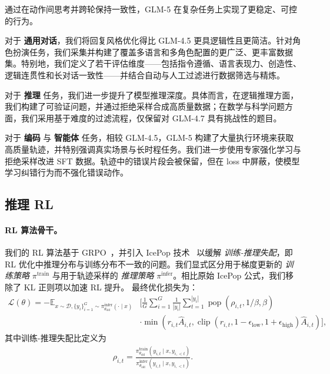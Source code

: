 通过在动作间思考并跨轮保持一致性，GLM-5 在复杂任务上实现了更稳定、可控的行为。

对于 \textbf{通用对话}，我们将回复风格优化得比 GLM-4.5 更具逻辑性且更简洁。针对角色扮演任务，我们采集并构建了覆盖多语言和多角色配置的更广泛、更丰富数据集。特别地，我们定义了若干评估维度——包括指令遵循、语言表现力、创造性、逻辑连贯性和长对话一致性——并结合自动与人工过滤进行数据筛选与精炼。

对于 \textbf{推理} 任务，我们进一步提升了模型推理深度。具体而言，在逻辑推理方面，我们构建了可验证问题，并通过拒绝采样合成高质量数据；在数学与科学问题方面，我们采用基于难度的过滤流程，仅保留对 GLM-4.7 具有挑战性的题目。

对于 \textbf{编码} 与 \textbf{智能体} 任务，相较 GLM-4.5，GLM-5 构建了大量执行环境来获取高质量轨迹，并特别强调真实场景与长时程任务。我们进一步使用专家强化学习与拒绝采样改进 SFT 数据。轨迹中的错误片段会被保留，但在 loss 中屏蔽，使模型学习纠错行为而不强化错误动作。

\subsection{推理 RL}

\paragraph{RL 算法骨干。}
我们的 RL 算法基于 GRPO~\cite{shao2024deepseekmath}，并引入 IcePop 技术~\cite{IcePop2025} 以缓解 \emph{训练-推理失配}，即 RL 优化中推理分布与训练分布不一致的问题。我们显式区分用于梯度更新的 \emph{训练策略} $\pi^{\text{train}}$ 与用于轨迹采样的 \emph{推理策略} $\pi^{\text{infer}}$。相比原始 IcePop 公式，我们移除了 KL 正则项以加速 RL 提升。
最终优化损失为：
\begin{equation}
\begin{aligned}
\mathcal{L}(\theta)=
-\mathbb{E}_{
x \sim \mathcal{D},
\{y_i\}_{i=1}^{G} \sim \pi^{\text{infer}}_{\theta_{\text{old}}}(\cdot \mid x)
}
&\Bigg[
\frac{1}{G}
\sum_{i=1}^{G}
\frac{1}{|y_i|}
\sum_{t=1}^{|y_i|}
\operatorname{pop}
(\rho_{i,t}, 1/\beta, \beta) \\
&\cdot
\min\!\left(
r_{i,t}\hat{A}_{i,t},
\operatorname{clip}\!\left(
r_{i,t},
1-\epsilon_{\text{low}},
1+\epsilon_{\text{high}}
\right)
\hat{A}_{i,t}
\right)
\Bigg],
\label{icepop}
\end{aligned}
\end{equation}
其中训练-推理失配比定义为
\begin{align*}
\rho_{i,t}
=
\frac{
\pi_{\theta_{\text{old}}}^{\text{train}}(y_{i,t} \mid x, y_{i,<t})
}{
\pi_{\theta_{\text{old}}}^{\text{infer}}(y_{i,t} \mid x, y_{i,<t})
}.
\end{align*}

